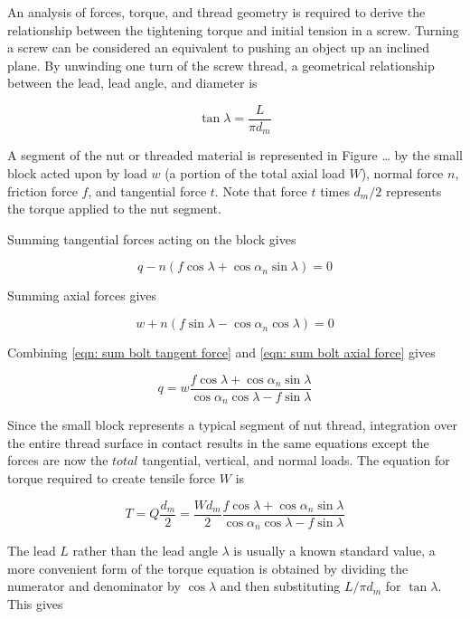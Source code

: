 \documentclass[
10pt,
a4paper,
openany,
svgnames,
]{book}
\begin{document}
An analysis of forces, torque, and thread geometry is required to derive the relationship between the tightening torque and initial tension in a screw.
Turning a screw can be considered an equivalent to pushing an object up an inclined plane. By unwinding one turn of the screw thread, a geometrical relationship between the lead, lead angle, and diameter is

\begin{equation}
  \tan \lambda  = \frac{L}{\pi d_m}
\end{equation}

A segment of the nut or threaded material is represented in Figure … by the small block acted upon by load $w$ (a portion of the total axial load $W$), normal force $n$, friction force $f$, and tangential force $t$. Note that force $t$ times $d_m/2$ represents the torque applied to the nut segment.

Summing tangential forces acting on the block gives

\begin{equation} \label{eqn: sum bolt tangent force}
  q - n(f\cos \lambda  + \cos \alpha_n\sin \lambda ) = 0
\end{equation}

Summing axial forces gives

\begin{equation} \label{eqn: sum bolt axial force}
  w + n(f\sin \lambda  - \cos \alpha_n\cos \lambda ) = 0
\end{equation}

Combining \cref{eqn: sum bolt tangent force} and \cref{eqn: sum bolt axial force} gives

\[q = w\frac{f\cos \lambda + \cos \alpha_n\sin \lambda }{\cos \alpha_n\cos \lambda  - f\sin \lambda }\]

Since the small block represents a typical segment of nut thread, integration over the entire thread surface in contact results in the same equations except the forces are now the $total$ tangential, vertical, and normal loads. The equation for torque required to create tensile force $W$ is

\begin{equation}
  T = Q\frac{d_m}{2} = \frac{Wd_m}{2}\frac{f\cos \lambda + \cos \alpha_n\sin \lambda }{\cos \alpha_n\cos \lambda - f\sin \lambda }
\end{equation}

The lead $L$ rather than the lead angle $\lambda$ is usually a known standard value, a more convenient form of the torque equation is obtained by dividing the numerator and denominator by $\cos \lambda$ and then substituting $L/\pi d_m$ for $\tan \lambda$. This gives
\end{document}
